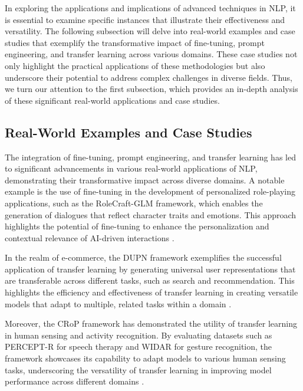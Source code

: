 In exploring the applications and implications of advanced techniques in NLP, it is essential to examine specific instances that illustrate their effectiveness and versatility. The following subsection will delve into real-world examples and case studies that exemplify the transformative impact of fine-tuning, prompt engineering, and transfer learning across various domains. These case studies not only highlight the practical applications of these methodologies but also underscore their potential to address complex challenges in diverse fields. Thus, we turn our attention to the first subsection, which provides an in-depth analysis of these significant real-world applications and case studies.






\subsection{Real-World Examples and Case Studies} \label{subsec:Real-World Examples and Case Studies}

The integration of fine-tuning, prompt engineering, and transfer learning has led to significant advancements in various real-world applications of NLP, demonstrating their transformative impact across diverse domains. A notable example is the use of fine-tuning in the development of personalized role-playing applications, such as the RoleCraft-GLM framework, which enables the generation of dialogues that reflect character traits and emotions. This approach highlights the potential of fine-tuning to enhance the personalization and contextual relevance of AI-driven interactions \cite{tao2024rolecraftglmadvancingpersonalizedroleplaying}.

In the realm of e-commerce, the DUPN framework exemplifies the successful application of transfer learning by generating universal user representations that are transferable across different tasks, such as search and recommendation. This highlights the efficiency and effectiveness of transfer learning in creating versatile models that adapt to multiple, related tasks within a domain \cite{ni2018perceiveusersdepthlearning}.

Moreover, the CRoP framework has demonstrated the utility of transfer learning in human sensing and activity recognition. By evaluating datasets such as PERCEPT-R for speech therapy and WIDAR for gesture recognition, the framework showcases its capability to adapt models to various human sensing tasks, underscoring the versatility of transfer learning in improving model performance across different domains \cite{kaur2024cropcontextwiserobuststatic}.

